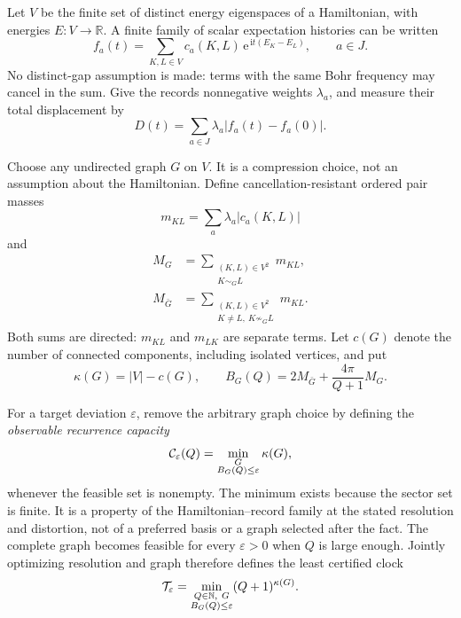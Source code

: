 \documentclass[10pt]{article}
\theoremstyle{definition}
\newcommand{\R}{\mathbb R}
\newcommand{\N}{\mathbb N}
\newcommand{\ee}{\mathrm e}
\begin{document}
Let \(V\) be the finite set of distinct energy eigenspaces of a Hamiltonian,
with energies \(E:V\to\R\). A finite family of scalar expectation histories
can be written
\begin{equation}
 f_a(t)=\sum_{K,L\in V}c_a(K,L)\,
   \ee^{\,\mathrm i t(E_K-E_L)},\qquad a\in J.
 \label{eq:history}
\end{equation}
No distinct-gap assumption is made: terms with the same Bohr frequency may
cancel in the sum. Give the records nonnegative weights \(\lambda_a\), and
measure their total displacement by
\begin{equation}
 D(t)=\sum_{a\in J}\lambda_a|f_a(t)-f_a(0)|.
 \label{eq:deviation}
\end{equation}

Choose any undirected graph \(G\) on \(V\). It is a compression choice, not
an assumption about the Hamiltonian. Define cancellation-resistant ordered
pair masses
\[
 m_{KL}=\sum_a\lambda_a|c_a(K,L)|
\]
and
\begin{align}
 M_G&=\sum_{\substack{(K,L)\in V^2\\K\sim_G L}}m_{KL},
 \label{eq:selected}\\
 M_{\bar G}&=\sum_{\substack{(K,L)\in V^2\\K\ne L,\ K\not\sim_G L}}m_{KL}.
 \label{eq:omitted}
\end{align}
Both sums are directed: \(m_{KL}\) and \(m_{LK}\) are separate terms.
Let \(c(G)\) denote the number of connected components, including isolated
vertices, and put
\begin{equation}
 \kappa(G)=|V|-c(G),\qquad
 B_G(Q)=2M_{\bar G}+\frac{4\pi}{Q+1}M_G.
 \label{eq:budget}
\end{equation}

For a target deviation \(\varepsilon\), remove the arbitrary graph choice
by defining the \emph{observable recurrence capacity}
\begin{equation}
 {\cal C}_{\varepsilon}(Q)=
 \min_{\substack{G\\B_G(Q)\le\varepsilon}}\kappa(G),
 \label{eq:optimal-capacity}
\end{equation}
whenever the feasible set is nonempty. The minimum exists because the
sector set is finite. It is a property of the Hamiltonian--record family at
the stated resolution and distortion, not of a preferred basis or a graph
selected after the fact.
The complete graph becomes feasible for every \(\varepsilon>0\) when \(Q\)
is large enough. Jointly optimizing resolution and graph therefore defines
the least certified clock
\begin{equation}
 {\cal T}_{\varepsilon}=
 \min_{\substack{Q\in\N,\ G\\B_G(Q)\le\varepsilon}}
 (Q+1)^{\kappa(G)}.
 \label{eq:optimal-clock}
\end{equation}
\end{document}
